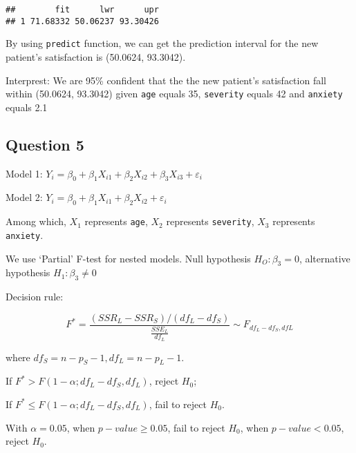 \documentclass[]{article}
\newenvironment{Shaded}{\begin{snugshade}}{\end{snugshade}}
\newcommand{\KeywordTok}[1]{\textcolor[rgb]{0.13,0.29,0.53}{\textbf{#1}}}
\newcommand{\DataTypeTok}[1]{\textcolor[rgb]{0.13,0.29,0.53}{#1}}
\newcommand{\StringTok}[1]{\textcolor[rgb]{0.31,0.60,0.02}{#1}}
\newcommand{\OperatorTok}[1]{\textcolor[rgb]{0.81,0.36,0.00}{\textbf{#1}}}
\newcommand{\NormalTok}[1]{#1}
\begin{document}
\begin{verbatim}
##        fit      lwr      upr
## 1 71.68332 50.06237 93.30426
\end{verbatim}

By using \texttt{predict} function, we can get the prediction interval
for the new patient's satisfaction is (50.0624, 93.3042).

Interprest: We are 95\% confident that the the new patient's
satisfaction fall within (50.0624, 93.3042) given \texttt{age} equals
35, \texttt{severity} equals 42 and \texttt{anxiety} equals 2.1

\subsection{Question 5}\label{question-5-1}

Model 1:
\(Y_i = \beta_0 + \beta_1X_{i1} + \beta_2X_{i2} + \beta_3X_{i3} + \varepsilon_i\)

Model 2:
\(Y_i = \beta_0 + \beta_1X_{i1} + \beta_2X_{i2} + \varepsilon_i\)

Among which, \(X_1\) represents \texttt{age}, \(X_2\) represents
\texttt{severity}, \(X_3\) represents \texttt{anxiety}.

We use `Partial' F-test for nested models. Null hypothesis
\(H_O: \beta_3 = 0\), alternative hypothesis \(H_1: \beta_3 \neq 0\)

Decision rule:

\[ F^*=\frac{(SSR_L-SSR_S)/(df_L-df_S)}{\frac{SSE_L}{df_L}} \sim F_{df_L-df_S,dfL} \]

where \(df_S = n-p_S-1, df_L = n-p_L-1\).

If \(F^* > F(1-\alpha;df_L-df_S,df_L)\), reject \(H_0\);

If \(F^* \leq F(1-\alpha;df_L-df_S,df_L)\), fail to reject \(H_0\).

With \(\alpha = 0.05\), when \(p-value \geq 0.05\), fail to reject
\(H_0\), when \(p-value < 0.05\), reject \(H_0\).

\begin{Shaded}
\end{Shaded}
\end{document}
